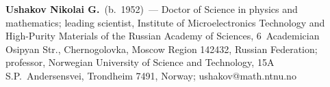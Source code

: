\vspace*{4pt} 

\noindent
\textbf{Ushakov Nikolai G.}\ (b.\ 1952)~---
 Doctor of Science in physics and mathematics; leading scientist, Institute of 
 Microelectronics Technology and High-Purity Materials of the Russian Academy of 
 Sciences, 6~Academician Osipyan Str., Chernogolovka, Moscow Region 142432, 
 Russian Federation; professor, Norwegian University of Science and Technology, 
 15A S.P.\ Andersensvei, Trondheim 7491, Norway; ushakov@math.ntnu.no 


\label{end\stat}


\renewcommand{\bibname}{\protect\rm Литература}